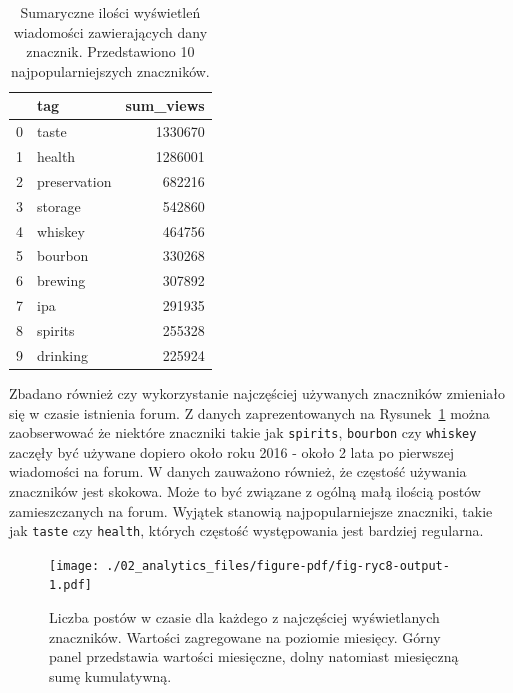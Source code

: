 \documentclass[
  letterpaper,
  DIV=11,
  numbers=noendperiod]{scrreprt}
\begin{document}
\hypertarget{tbl-tags_views}{}
\begin{table}
\caption{\label{tbl-tags_views}Sumaryczne ilości wyświetleń wiadomości zawierających dany znacznik.
Przedstawiono 10 najpopularniejszych znaczników. }\tabularnewline

\centering
\begin{tabular}{llr}
\toprule
{} &           tag &  sum\_views \\
\midrule
0 &         taste &    1330670 \\
1 &        health &    1286001 \\
2 &  preservation &     682216 \\
3 &       storage &     542860 \\
4 &       whiskey &     464756 \\
5 &       bourbon &     330268 \\
6 &       brewing &     307892 \\
7 &           ipa &     291935 \\
8 &       spirits &     255328 \\
9 &      drinking &     225924 \\
\bottomrule
\end{tabular}
\end{table}

Zbadano również czy wykorzystanie najczęściej używanych znaczników
zmieniało się w czasie istnienia forum. Z danych zaprezentowanych na
Rysunek~\ref{fig-ryc8} można zaobserwować że niektóre znaczniki takie
jak \texttt{spirits}, \texttt{bourbon} czy \texttt{whiskey} zaczęły być
używane dopiero około roku 2016 - około 2 lata po pierwszej wiadomości
na forum. W danych zauważono również, że częstość używania znaczników
jest skokowa. Może to być związane z ogólną małą ilością postów
zamieszczanych na forum. Wyjątek stanowią najpopularniejsze znaczniki,
takie jak \texttt{taste} czy \texttt{health}, których częstość
występowania jest bardziej regularna.

\begin{figure}

{\centering \texttt{[image: ./02\_analytics\_files/figure-pdf/fig-ryc8-output-1.pdf]}

}

\caption{\label{fig-ryc8}Liczba postów w czasie dla każdego z
najczęściej wyświetlanych znaczników. Wartości zagregowane na poziomie
miesięcy. Górny panel przedstawia wartości miesięczne, dolny natomiast
miesięczną sumę kumulatywną.}

\end{figure}
\end{document}

